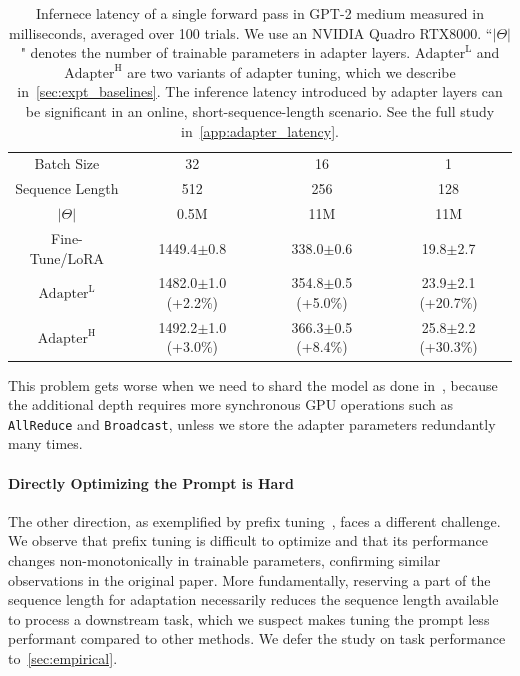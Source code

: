 \documentclass{article} %
\begin{document}
\begin{table}[h]
  \centering
  \begin{tabular}{c|ccc}
  \hline
  \toprule

  Batch Size              &  32                 & 16        & 1    \\
  Sequence Length         &  512                & 256       & 128  \\
  $|\Theta|$              &  0.5M         & 11M & 11M     \\
  \midrule
  Fine-Tune/LoRA               & 1449.4$\pm$0.8           & 338.0$\pm$0.6  & 19.8$\pm$2.7 \\
  \midrule
  $\text{Adapter}^{\text{L}}$   & 1482.0$\pm$1.0 (\textcolor{myred1}{+2.2\%})  & 354.8$\pm$0.5 (\textcolor{myred2}{+5.0\%})  & 23.9$\pm$2.1 (\textcolor{myred3}{+20.7\%}) \\
  $\text{Adapter}^{\text{H}}$   & 1492.2$\pm$1.0 (\textcolor{myred1}{+3.0\%})  & 366.3$\pm$0.5 (\textcolor{myred2}{+8.4\%})  & 25.8$\pm$2.2 (\textcolor{myred3}{+30.3\%}) \\
  \bottomrule
  \end{tabular}
  \caption{Infernece latency of a single forward pass in GPT-2 medium measured in milliseconds, averaged over 100 trials. We use an NVIDIA Quadro RTX8000. ``$|\Theta|$" denotes the number of trainable parameters in adapter layers. $\text{Adapter}^{\text{L}}$ and $\text{Adapter}^{\text{H}}$ are two variants of adapter tuning, which we describe in~\autoref{sec:expt_baselines}. The inference latency introduced by adapter layers can be significant in an online, short-sequence-length scenario. See the full study in~\autoref{app:adapter_latency}.}
  \label{tab:adapter_slow}
\end{table}

This problem gets worse when we need to shard the model as done in~\citet{shoeybi2020megatronlm, lepikhin2020gshard}, because the additional depth requires more synchronous GPU operations such as \texttt{AllReduce} and \texttt{Broadcast}, unless we store the adapter parameters redundantly many times.

\paragraph{Directly Optimizing the Prompt is Hard}
The other direction, as exemplified by prefix tuning~\citep{li_prefix-tuning_2021}, faces a different challenge.
We observe that prefix tuning is difficult to optimize and that its performance changes non-monotonically in trainable parameters, confirming similar observations in the original paper.
More fundamentally, reserving a part of the sequence length for adaptation necessarily reduces the sequence length available to process a downstream task, which we suspect makes tuning the prompt less performant compared to other methods.
We defer the study on task performance to~\autoref{sec:empirical}.
\end{document}
